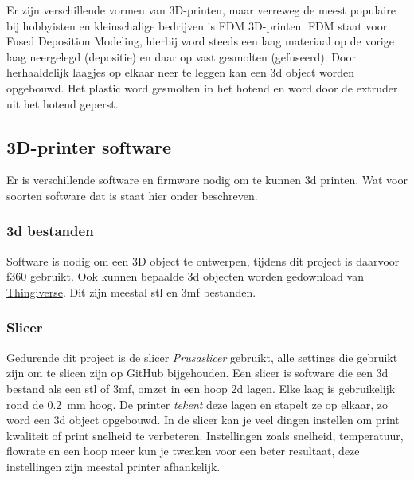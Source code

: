 Er zijn verschillende vormen van 3D-printen, maar verreweg de meest populaire
bij hobbyisten en kleinschalige bedrijven is FDM 3D-printen. FDM staat voor
Fused Deposition Modeling, hierbij word steeds een laag materiaal op de vorige
laag neergelegd (depositie) en daar op vast gesmolten (gefuseerd). Door
herhaaldelijk laagjes op elkaar neer te leggen kan een \ac{3d} object worden
opgebouwd. Het plastic word gesmolten in het hotend en word door de extruder
uit het hotend geperst.

\subsection{3D-printer software}

Er is verschillende software en firmware nodig om te kunnen \ac{3d} printen.
Wat voor soorten software dat is staat hier onder beschreven.

\subsubsection{\ac{3d} bestanden}

Software is nodig om een 3D object te ontwerpen, tijdens dit project is
daarvoor \ac{f360} gebruikt. Ook kunnen bepaalde \ac{3d} objecten worden
gedownload van \href{https://www.thingiverse.com}{Thingiverse}. Dit zijn
meestal \ac{stl} en \ac{3mf} bestanden.

\subsubsection{Slicer}

Gedurende dit project is de slicer \emph{Prusaslicer} gebruikt, alle settings
die gebruikt zijn om te slicen zijn op GitHub bijgehouden.  Een slicer is
software die een \ac{3d} bestand als een \ac{stl} of \ac{3mf}, omzet in een
hoop \ac{2d} lagen. Elke laag is gebruikelijk rond de \SI{0.2}{\milli\meter}
hoog. De printer \emph{tekent} deze lagen en stapelt ze op elkaar, zo word een
\ac{3d} object opgebouwd. In de slicer kan je veel dingen instellen om print
kwaliteit of print snelheid te verbeteren. Instellingen zoals snelheid,
temperatuur, flowrate en een hoop meer kun je tweaken voor een beter resultaat,
deze instellingen zijn meestal printer afhankelijk.

